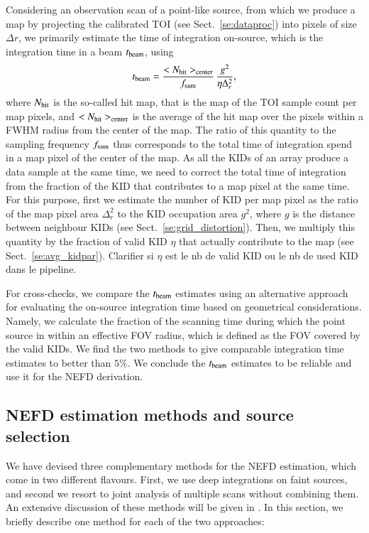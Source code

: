 Considering an observation scan of a point-like source, from which we
produce a map by projecting the calibrated TOI (see
Sect.~\ref{se:dataproc}) into pixels of size $\Delta r$, we primarily
estimate the time of integration on-source, which is the integration
time in a beam $t_{\rm{beam}}$, using
%
\begin{equation}
  t_{\rm{beam}} = \frac{<N_{\rm{hit}}>_{\rm{center}}}{f_{\rm{sam}}}\,
  \frac{g^2}{\eta\Delta_r^2},
  \label{eq:integration_time}
\end{equation}
%
where $N_{\rm{hit}}$ is the so-called hit map, that is the map of the
TOI sample count per map pixels, and $<N_{\rm{hit}}>_{\rm{center}}$
is the average of the hit map over the pixels within a FWHM radius
from the center of the map. The ratio of this quantity to the sampling
frequency $f_{\rm{sam}}$ thus corresponds to the total time of integration
spend in a map pixel of the center of the map. As all the KIDs of an
array produce a data sample at the same time, we need to correct the
total time of integration from the fraction of the KID that
contributes to a map pixel at the same time. For this purpose, first
we estimate the number of KID per map pixel as the ratio of the map
pixel area $\Delta_r^2$ to the KID occupation area $g^2$, where $g$ is
the distance between neighbour KIDs (see
Sect.~\ref{se:grid_distortion}). Then, we multiply
this quantity by the fraction of valid KID $\eta$ that actually
contribute to the map (see
Sect.~\ref{se:avg_kidpar}). {\color{magenta} Clarifier si $\eta$ est
  le nb de valid KID ou le nb de used KID dans le pipeline.}

For cross-checks, we compare the $t_{\rm{beam}}$ estimates using an
alternative approach for evaluating the on-source integration
time based on geometrical considerations. Namely, we calculate the
fraction of the scanning time during which the point source in within
an effective FOV radius, which is defined as the FOV covered by the
valid KIDs. We find the two methods to give comparable integration
time estimates to better than $5\%$. We conclude the $t_{\rm{beam}}$
estimates to be reliable and use it for the NEFD derivation.  


\subsection{NEFD estimation methods and source selection}
\label{se:nefd_method}

We have devised three complementary methods for the
NEFD estimation, which come in two different flavours. First, we
use deep integrations on faint sources, and second we resort to 
joint analysis of multiple scans without combining them. An
extensive discussion of these methods will be given in
\citet{Ponthieu2019}. In this section, we briefly describe one method
for each of the two approaches: \\

